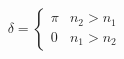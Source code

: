 

\vspace*{\fill}
\centering

\begin{align*}
   \delta = 
   \begin{cases}
   \pi & n_2 > n_1 \\
   0 & n_1 > n_2
   \end{cases} 
\end{align*}

\centering
\vspace*{\fill}

